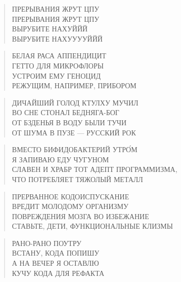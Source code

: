 \poemtitle{***}
\begin{verse}
ПРЕРЫВАНИЯ ЖРУТ ЦПУ\\
ПРЕРЫВАНИЯ ЖРУТ ЦПУ\\
ВЫРУБИТЕ НАХУЙЙЙ\\
ВЫРУБИТЕ НАХУУУУЙЙЙ
\end{verse}

\poemtitle{***}
\begin{verse}
БЕЛАЯ РАСА АППЕНДИЦИТ\\
ГЕТТО ДЛЯ МИКРОФЛОРЫ\\
УСТРОИМ ЕМУ ГЕНОЦИД\\
РЕЖУЩИМ, НАПРИМЕР, ПРИБОРОМ
\end{verse}

\poemtitle{***}
\begin{verse}
ДИЧАЙШИЙ ГОЛОД КТУЛХУ МУЧИЛ\\
ВО СНЕ СТОНАЛ БЕДНЯГА-БОГ\\
ОТ БЗДЕНЬЯ В ВОДУ БЫЛИ ТУЧИ\\
ОТ ШУМА В ПУЗЕ — РУССКИЙ РОК
\end{verse}

\poemtitle{***}
\begin{verse}
ВМЕСТО БИФИДОБАКТЕРИЙ УТРО́М\\
Я ЗАПИВАЮ ЕДУ ЧУГУНОМ\\
СЛАВЕН И ХРАБР ТОТ АДЕПТ ПРОГРАММИЗМА,\\
ЧТО ПОТРЕБЛЯЕТ ТЯЖОЛЫЙ МЕТАЛЛ
\end{verse}

\poemtitle{***}
\begin{verse}
ПРЕРВАННОЕ КОДОИСПУСКАНИЕ\\
ВРЕДИТ МОЛОДОМУ ОРГАНИЗМУ\\
ПОВРЕЖДЕНИЯ МОЗГА ВО ИЗБЕЖАНИЕ \\
СТАВЬТЕ, ДЕТИ, ФУНКЦИОНАЛЬНЫЕ КЛИЗМЫ
\end{verse}

\poemtitle{***}
\begin{verse}
РАНО-РАНО ПОУТРУ\\
ВСТАНУ, КОДА ПОПИШУ\\
А НА ВЕЧЕР Я ОСТАВЛЮ\\
КУЧУ КОДА ДЛЯ РЕФАКТА
\end{verse}

